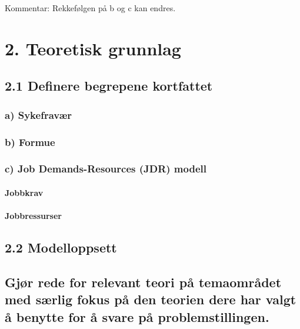 \documentclass[
  12pt,
  a4paper,
  DIV=11,
  numbers=noendperiod]{scrartcl}
\let\oldparagraph\paragraph
\renewcommand{\paragraph}[1]{\oldparagraph{#1}\mbox{}}
\begin{document}
Kommentar: Rekkefølgen på b og c kan endres.

\section{2. Teoretisk grunnlag}\label{teoretisk-grunnlag}

\subsection{2.1 Definere begrepene
kortfattet}\label{definere-begrepene-kortfattet}

\subsubsection{a) Sykefravær}\label{a-sykefravuxe6r}

\subsubsection{b) Formue}\label{b-formue}

\subsubsection{c) Job Demands-Resources (JDR)
modell}\label{c-job-demands-resources-jdr-modell}

\paragraph{Jobbkrav}\label{jobbkrav}

\paragraph{Jobbressurser}\label{jobbressurser}

\subsection{2.2 Modelloppsett}\label{modelloppsett}

\subsection{Gjør rede for relevant teori på temaområdet med særlig fokus
på den teorien dere har valgt å benytte for å svare på
problemstillingen.}\label{gjuxf8r-rede-for-relevant-teori-puxe5-temaomruxe5det-med-suxe6rlig-fokus-puxe5-den-teorien-dere-har-valgt-uxe5-benytte-for-uxe5-svare-puxe5-problemstillingen.}
\end{document}
